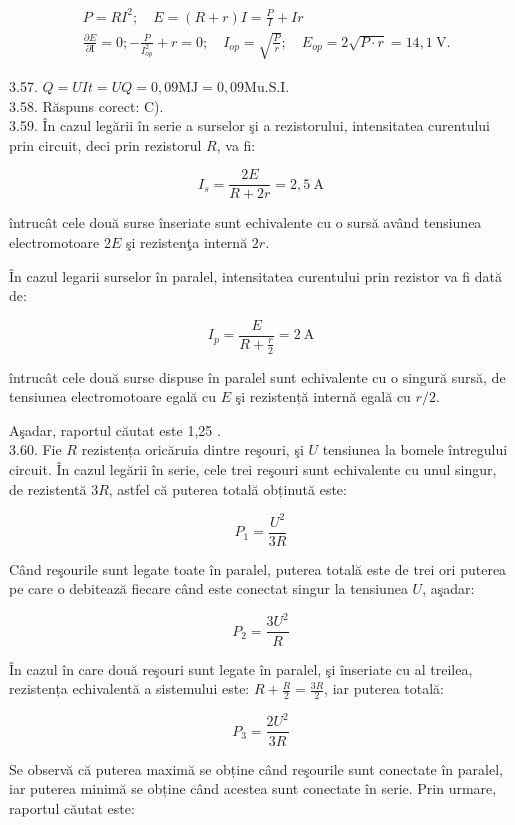 $$
\begin{aligned}
& P=R I^{2} ; \quad E=(R+r) I=\frac{P}{I}+I r \\
& \frac{\partial E}{\partial \mathrm{I}}=0 ;-\frac{P}{I_{o p}^{2}}+r=0 ; \quad I_{o p}=\sqrt{\frac{P}{r}} ; \quad E_{o p}=2 \sqrt{P \cdot r}=14,1 \mathrm{~V} .
\end{aligned}
$$

3.57. $Q=U I t=U Q=0,09 \mathrm{MJ}=0,09 \mathrm{Mu} . \mathrm{S} . \mathrm{I}$.\\
3.58. Răspuns corect: C).\\
3.59. În cazul legării în serie a surselor şi a rezistorului, intensitatea curentului prin circuit, deci prin rezistorul $R$, va fi:

$$
I_{s}=\frac{2 E}{R+2 r}=2,5 \mathrm{~A}
$$

întrucât cele două surse înseriate sunt echivalente cu o sursă având tensiunea electromotoare $2 E$ şi rezistenţa internă $2 r$.

În cazul legarii surselor în paralel, intensitatea curentului prin rezistor va fi dată de:

$$
I_{p}=\frac{E}{R+\frac{r}{2}}=2 \mathrm{~A}
$$

întrucât cele două surse dispuse în paralel sunt echivalente cu o singură sursă, de tensiunea electromotoare egală cu $E$ şi rezistență internă egală cu $r / 2$.

Aşadar, raportul căutat este 1,25 .\\
3.60. Fie $R$ rezistența oricăruia dintre reşouri, şi $U$ tensiunea la bomele întregului circuit. În cazul legării în serie, cele trei reşouri sunt echivalente cu unul singur, de rezistentă $3 R$, astfel că puterea totală obținută este:

$$
P_{1}=\frac{U^{2}}{3 R}
$$

Când reşourile sunt legate toate în paralel, puterea totală este de trei ori puterea pe care o debitează fiecare când este conectat singur la tensiunea $U$, aşadar:

$$
P_{2}=\frac{3 U^{2}}{R}
$$

În cazul în care două reşouri sunt legate în paralel, şi înseriate cu al treilea, rezistența echivalentă a sistemului este: $R+\frac{R}{2}=\frac{3 R}{2}$, iar puterea totală:

$$
P_{3}=\frac{2 U^{2}}{3 R}
$$

Se observă că puterea maximă se obține când reşourile sunt conectate în paralel, iar puterea minimă se obține când acestea sunt conectate în serie. Prin urmare, raportul căutat este:

